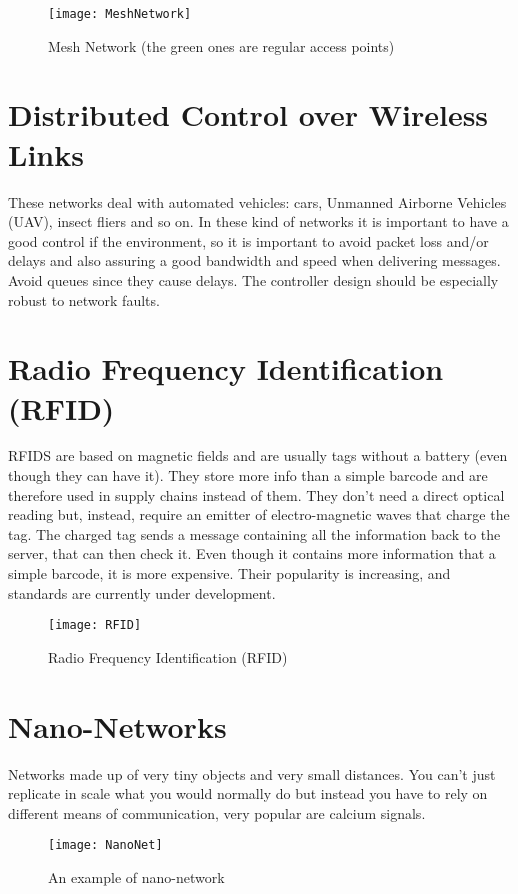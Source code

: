 \begin{figure}[!h]
  \centering
  \texttt{[image: MeshNetwork]}
  \caption{Mesh Network (the green ones are regular access 
    points)}
  \label{fig:mn:MeshNetwork}
\end{figure}	

\section{Distributed Control over Wireless Links}
These networks deal with automated vehicles: cars, Unmanned Airborne 
Vehicles (UAV), insect fliers and so on.
In these kind of networks it is important to have a good control if the 
environment, so it is important to avoid packet loss and/or delays and also 
assuring a good bandwidth and speed when delivering messages. Avoid queues since 
they cause delays.
The controller design should be especially robust to network faults.

\section{Radio Frequency Identification (RFID)}
RFIDS are based on magnetic fields and are usually tags without a 
battery (even though they can have it). They store more info than a simple 
barcode and are therefore used in supply chains instead of them. They don't 
need a direct optical reading but, instead, require an emitter of 
electro-magnetic waves that charge the tag. The charged tag sends a message 
containing all the information back to the server, that can then check it.
Even though it contains more information that a simple barcode, it is 
more expensive. Their popularity is increasing, and standards are currently 
under development.

\begin{figure}[t]
  \centering
  \texttt{[image: RFID]}
  \caption{Radio Frequency Identification (RFID)}
  \label{fig:ewn:RFID}
\end{figure}

\section{Nano-Networks}
Networks made up of very tiny objects and very small distances. You 
can't just replicate in scale what you would normally do  but instead you have 
to rely on different means of communication, very popular are calcium signals.

\begin{figure}[t]
  \centering
  \texttt{[image: NanoNet]}
  \caption{An example of nano-network}				
  \label{fig:ewn:NanoNet}
\end{figure}


